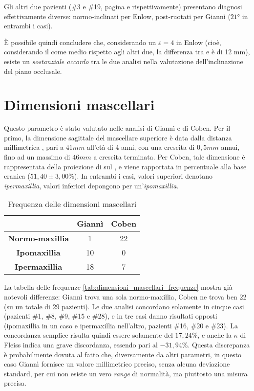 Gli altri due pazienti (\#3 e \#19, pagina \pageref{paz:MASCHI2000} e \pageref{paz:ELITRI1998} rispettivamente) presentano diagnosi effettivamente diverse: normo-inclinati per Enlow, post-ruotati per Giannì ($21°$ in entrambi i casi).

È possibile quindi concludere che, considerando un $\varepsilon = 4$ in Enlow (cioè, considerando il  come medio rispetto agli altri due, la differenza tra  e  è di 12 mm), esiste un \emph{sostanziale accordo} tra le due analisi nella valutazione dell'inclinazione del piano occlusale.

\section{Dimensioni mascellari}
Questo parametro è stato valutato nelle analisi di Giannì e di Coben. Per il primo, la dimensione sagittale del mascellare superiore è data dalla distanza millimetrica , pari a $41 mm$ all'età di 4 anni, con una crescita di $0,5 mm$ annui, fino ad un massimo di $46 mm$ a crescita terminata. Per Coben, tale dimensione è rappresentata della proiezione di  sul , e viene rapportata in percentuale alla base cranica  ($51,40 \pm 3,00\%$). In entrambi i casi, valori superiori denotano \emph{ipermaxillia}, valori inferiori depongono per un'\emph{ipomaxillia}.

\begin{table}
\centering
\caption{Frequenza delle dimensioni mascellari}
\label{tab:dimensioni_mascellari_frequenze}
\begin{tabular}{>{\bfseries}ccc}
\toprule
& \textbf{Giannì} & \textbf{Coben} \\
\midrule
Normo-maxillia & 1 & 22 \\
Ipomaxillia & 10 & 0 \\
Ipermaxillia & 18 & 7 \\
\bottomrule
\end{tabular}
\end{table}

La tabella delle frequenze \vref{tab:dimensioni_mascellari_frequenze} mostra già notevoli differenze: Giannì trova una sola normo-maxillia, Coben ne trova ben 22 (su un totale di 29 pazienti). Le due analisi concordano solamente in cinque casi (pazienti \#1, \#8, \#9, \#15 e \#28), e in tre casi danno risultati opposti (ipomaxillia in un caso e ipermaxillia nell'altro, pazienti \#16, \#20 e \#23). La concordanza semplice risulta quindi essere solamente del $17,24\%$, e anche la $\kappa$ di Fleiss indica una grave discordanza, essendo pari al $-31,94\%$. Questa discrepanza è probabilmente dovuta al fatto che, diversamente da altri parametri, in questo caso Giannì fornisce un valore millimetrico preciso, senza alcuna deviazione standard, per cui non esiste un vero \emph{range} di normalità, ma piuttosto una misura precisa.

